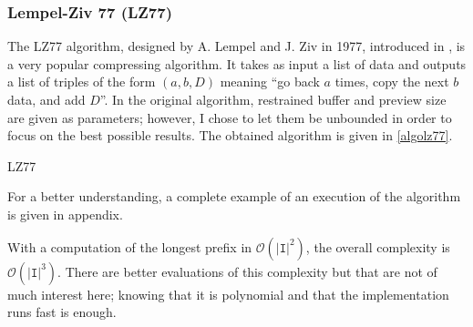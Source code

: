 \documentclass[a4paper,10pt]{article}
\newcommand{\guill}[1]{``#1''}
\newcommand{\bigO}[1]{\mathcal O\left( #1 \right)}
\begin{document}
\subsubsection{Lempel-Ziv 77 (LZ77)}

The LZ77 algorithm, designed by A. Lempel and J. Ziv in 1977, introduced in \cite{lempelziv}, is a very popular compressing algorithm. It takes as input a list of data and outputs a list of triples of the form $(a,b,D)$ meaning \guill{go back $a$ times, copy the next $b$ data, and add $D$}. In the original algorithm, restrained buffer and preview size are given as parameters; however, I chose to let them be unbounded in order to focus on the best possible results. The obtained algorithm is given in \ref{algolz77}.

\begin{algorithm}
\caption{LZ77 \label{algolz77}}
       
   


\end{algorithm}


For a better understanding, a complete example of an execution of the algorithm is given in appendix.

With a computation of the longest prefix in $\bigO{|\texttt{I}|^2}$, the overall complexity is $\bigO{|\texttt{I}|^3}$. There are better evaluations of this complexity but that are not of much interest here; knowing that it is polynomial and that the implementation runs fast is enough.
\end{document}
